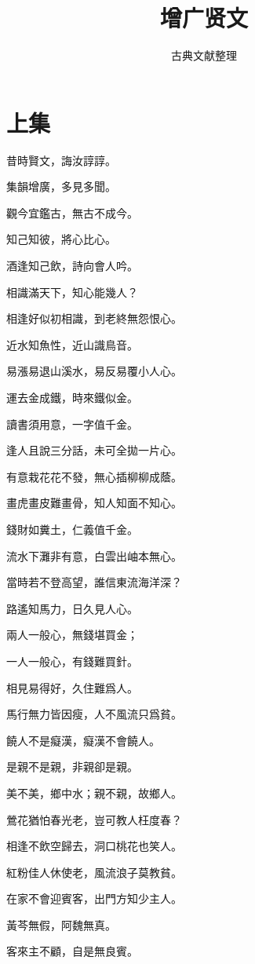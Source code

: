 \documentclass[12pt,a4paper]{ctexbook}
\title{增广贤文}
\author{古典文献整理}
\date{}
\begin{document}
\maketitle
\tableofcontents
\newpage
\section{上集}
昔時賢文，誨汝諄諄。\par
集韻增廣，多見多聞。\par
觀今宜鑑古，無古不成今。\par
知己知彼，將心比心。\par
酒逢知己飲，詩向會人吟。\par
相識滿天下，知心能幾人？\par
相逢好似初相識，到老終無怨恨心。\par
近水知魚性，近山識鳥音。\par
易漲易退山溪水，易反易覆小人心。\par
運去金成鐵，時來鐵似金。\par
讀書須用意，一字值千金。\par
逢人且說三分話，未可全拋一片心。\par
有意栽花花不發，無心插柳柳成蔭。\par
畫虎畫皮難畫骨，知人知面不知心。\par
錢財如糞土，仁義值千金。\par
流水下灘非有意，白雲出岫本無心。\par
當時若不登高望，誰信東流海洋深？\par
路遙知馬力，日久見人心。\par
兩人一般心，無錢堪買金；\par
一人一般心，有錢難買針。\par
相見易得好，久住難爲人。\par
馬行無力皆因瘦，人不風流只爲貧。\par
饒人不是癡漢，癡漢不會饒人。\par
是親不是親，非親卻是親。\par
美不美，鄉中水；親不親，故鄉人。\par
鶯花猶怕春光老，豈可教人枉度春？\par
相逢不飲空歸去，洞口桃花也笑人。\par
紅粉佳人休使老，風流浪子莫教貧。\par
在家不會迎賓客，出門方知少主人。\par
黃芩無假，阿魏無真。\par
客來主不顧，自是無良賓。\par
\end{document}
